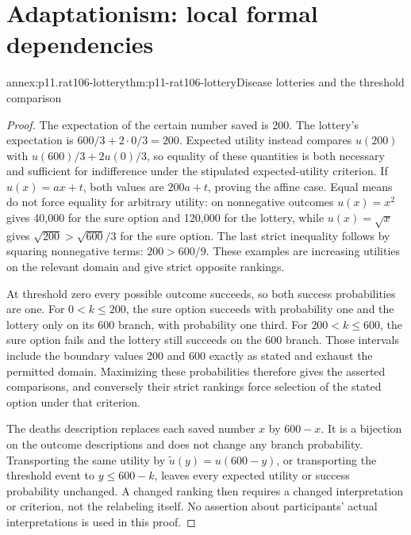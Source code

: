 \section{Adaptationism: local formal dependencies}
\label{sec:p11-rat106-proof-annex}

\begin{annexitem}{annex:p11.rat106-lottery}{thm:p11-rat106-lottery}{Disease lotteries and the threshold comparison}
\begin{proof}
The expectation of the certain number saved is 200. The lottery's
expectation is \(600/3+2\cdot0/3=200\). Expected utility instead
compares \(u(200)\) with \(u(600)/3+2u(0)/3\), so equality of
these quantities is both necessary and sufficient for indifference
under the stipulated expected-utility criterion. If
\(u(x)=ax+t\), both values are \(200a+t\), proving the affine
case. Equal means do not force equality for arbitrary utility:
on nonnegative outcomes \(u(x)=x^2\) gives 40,000 for the sure
option and 120,000 for the lottery, while \(u(x)=\sqrt{x}\)
gives \(\sqrt{200}>\sqrt{600}/3\) for the sure option. The last
strict inequality follows by squaring nonnegative terms: \(200>600/9\).
These examples are increasing utilities on the relevant domain and
give strict opposite rankings.

At threshold zero every possible outcome succeeds, so both success
probabilities are one. For \(0<k\leq200\), the sure option
succeeds with probability one and the lottery only on its 600 branch,
with probability one third. For \(200<k\leq600\), the sure
option fails and the lottery still succeeds on the 600 branch.
Those intervals include the boundary values 200 and 600 exactly as
stated and exhaust the permitted domain. Maximizing these probabilities
therefore gives the asserted comparisons, and conversely their strict
rankings force selection of the stated option under that criterion.

The deaths description replaces each saved number \(x\) by
\(600-x\). It is a bijection on the outcome descriptions and
does not change any branch probability. Transporting the same
utility by \(\widetilde u(y)=u(600-y)\), or transporting the
threshold event to \(y\leq600-k\), leaves every expected
utility or success probability unchanged. A changed ranking then
requires a changed interpretation or criterion, not the relabeling
itself. No assertion about participants' actual interpretations is
used in this proof.
\end{proof}
\end{annexitem}

